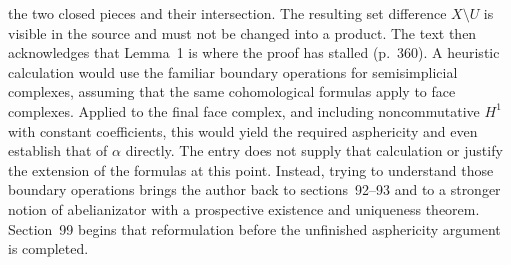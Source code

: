 \documentclass[10pt,oneside]{book}
\begin{document}
the two closed pieces and their intersection. The resulting set difference $X\setminus U$ is visible in the source and must not be changed into a product. The text then acknowledges that Lemma~1 is where the proof has stalled (p.~360). A heuristic calculation would use the familiar boundary operations for semisimplicial complexes, assuming that the same cohomological formulas apply to face complexes. Applied to the final face complex, and including noncommutative $H^1$ with constant coefficients, this would yield the required asphericity and even establish that of $\alpha$ directly. The entry does not supply that calculation or justify the extension of the formulas at this point. Instead, trying to understand those boundary operations brings the author back to sections~92--93 and to a stronger notion of abelianizator with a prospective existence and uniqueness theorem. Section~99 begins that reformulation before the unfinished asphericity argument is completed.
\end{document}
